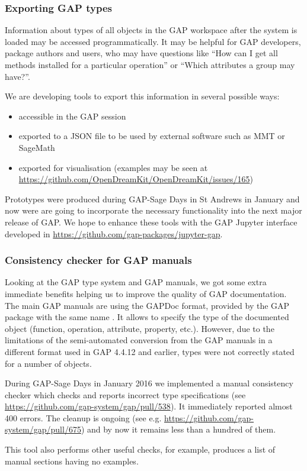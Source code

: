 
\subsubsection{Exporting GAP types}\label{gap-types-export}

Information about types of all objects in the GAP workspace after the system
is loaded may be accessed programmatically. It may be helpful for GAP developers,
package authors and users, who may have questions like 
``How can I get all methods installed for a particular operation'' or 
``Which attributes a group may have?''. 

We are developing tools to export this information in several possible ways:
\begin{itemize}
\item accessible in the GAP session
\item exported to a JSON file to be used by external software such as MMT or
SageMath
\item exported for visualisation (examples may be seen at 
\url{https://github.com/OpenDreamKit/OpenDreamKit/issues/165})
\end{itemize}

Prototypes were produced during GAP-Sage Days in St Andrews in January
and now were are going to incorporate the necessary functionality into
the next major release of GAP. We hope to enhance these tools with the 
GAP Jupyter interface developed in \url{https://github.com/gap-packages/jupyter-gap}.

\subsubsection{Consistency checker for GAP manuals}\label{gap-types}

Looking at the GAP type system and GAP manuals, we got some extra immediate benefits
helping us to improve the quality of GAP documentation. The main GAP manuals are using
the GAPDoc format, provided by the GAP package with the same name \cite{gapdoc}. It 
allows to specify the type of the documented object (function, operation, attribute,
property, etc.). However, due to the limitations of the semi-automated conversion from 
the GAP manuals in a different format used in GAP 4.4.12 and earlier, types were not
correctly stated for a number of objects. 

During GAP-Sage Days in January 2016 we implemented a manual 
consistency checker which checks and reports incorrect type specifications 
(see \url{https://github.com/gap-system/gap/pull/538}). 
It immediately reported almost 400 errors. The cleanup is ongoing 
(see e.g. \url{https://github.com/gap-system/gap/pull/675}) and by now it
remains less than a hundred of them.

This tool also performs other useful checks, for example, produces a list of
manual sections having no examples. 

